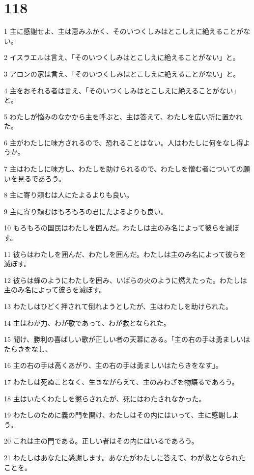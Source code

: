 \chapter{118}

\par 1 主に感謝せよ、主は恵みふかく、そのいつくしみはとこしえに絶えることがない。
\par 2 イスラエルは言え、「そのいつくしみはとこしえに絶えることがない」と。
\par 3 アロンの家は言え、「そのいつくしみはとこしえに絶えることがない」と。
\par 4 主をおそれる者は言え、「そのいつくしみはとこしえに絶えることがない」と。
\par 5 わたしが悩みのなかから主を呼ぶと、主は答えて、わたしを広い所に置かれた。
\par 6 主がわたしに味方されるので、恐れることはない。人はわたしに何をなし得ようか。
\par 7 主はわたしに味方し、わたしを助けられるので、わたしを憎む者についての願いを見るであろう。
\par 8 主に寄り頼むは人にたよるよりも良い。
\par 9 主に寄り頼むはもろもろの君にたよるよりも良い。
\par 10 もろもろの国民はわたしを囲んだ。わたしは主のみ名によって彼らを滅ぼす。
\par 11 彼らはわたしを囲んだ、わたしを囲んだ。わたしは主のみ名によって彼らを滅ぼす。
\par 12 彼らは蜂のようにわたしを囲み、いばらの火のように燃えたった。わたしは主のみ名によって彼らを滅ぼす。
\par 13 わたしはひどく押されて倒れようとしたが、主はわたしを助けられた。
\par 14 主はわが力、わが歌であって、わが救となられた。
\par 15 聞け、勝利の喜ばしい歌が正しい者の天幕にある。「主の右の手は勇ましいはたらきをなし、
\par 16 主の右の手は高くあがり、主の右の手は勇ましいはたらきをなす」。
\par 17 わたしは死ぬことなく、生きながらえて、主のみわざを物語るであろう。
\par 18 主はいたくわたしを懲らされたが、死にはわたされなかった。
\par 19 わたしのために義の門を開け、わたしはその内にはいって、主に感謝しよう。
\par 20 これは主の門である。正しい者はその内にはいるであろう。
\par 21 わたしはあなたに感謝します。あなたがわたしに答えて、わが救となられたことを。
